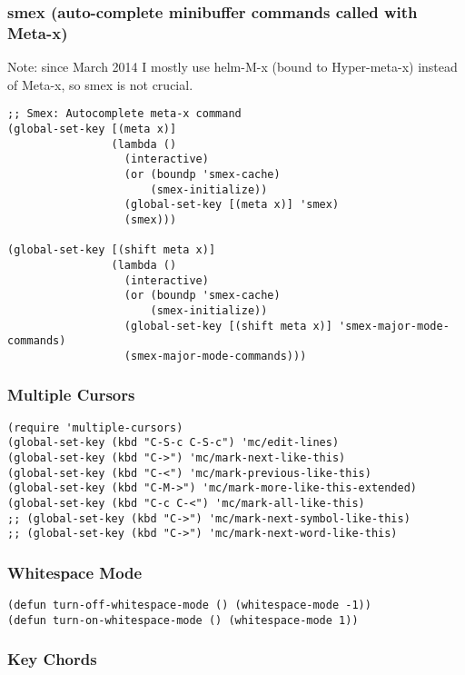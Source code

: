 \documentclass{article}
\begin{document}
\subsubsection{smex (auto-complete minibuffer commands called with Meta-x)}
\label{sec-1-11-13}

Note: since March 2014 I mostly use helm-M-x (bound to Hyper-meta-x) instead of Meta-x, so smex is not crucial.

\begin{verbatim}
;; Smex: Autocomplete meta-x command
(global-set-key [(meta x)]
                (lambda ()
                  (interactive)
                  (or (boundp 'smex-cache)
                      (smex-initialize))
                  (global-set-key [(meta x)] 'smex)
                  (smex)))

(global-set-key [(shift meta x)]
                (lambda ()
                  (interactive)
                  (or (boundp 'smex-cache)
                      (smex-initialize))
                  (global-set-key [(shift meta x)] 'smex-major-mode-commands)
                  (smex-major-mode-commands)))
\end{verbatim}

\subsubsection{Multiple Cursors}
\label{sec-1-11-14}

\begin{verbatim}
(require 'multiple-cursors)
(global-set-key (kbd "C-S-c C-S-c") 'mc/edit-lines)
(global-set-key (kbd "C->") 'mc/mark-next-like-this)
(global-set-key (kbd "C-<") 'mc/mark-previous-like-this)
(global-set-key (kbd "C-M->") 'mc/mark-more-like-this-extended)
(global-set-key (kbd "C-c C-<") 'mc/mark-all-like-this)
;; (global-set-key (kbd "C->") 'mc/mark-next-symbol-like-this)
;; (global-set-key (kbd "C->") 'mc/mark-next-word-like-this)
\end{verbatim}

\subsubsection{Whitespace Mode}
\label{sec-1-11-15}

\begin{verbatim}
(defun turn-off-whitespace-mode () (whitespace-mode -1))
(defun turn-on-whitespace-mode () (whitespace-mode 1))
\end{verbatim}

\subsubsection{Key Chords}
\label{sec-1-11-16}
\end{document}
